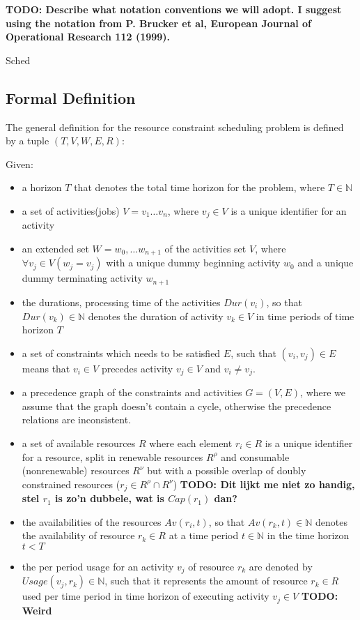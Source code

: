 \documentclass{article}
\newcommand{\TODO}[1]{{\color{red}\textbf{TODO: #1}}}
\newcommand{\renres}[0]{R^\rho} %
\newcommand{\conres}[0]{R^\nu} %
\newcommand{\av}[1]{\textit{Av}(#1)} %
\newcommand{\dur}[1]{\textit{Dur}(#1)} %
\newcommand{\usage}[1]{\textit{Usage}(#1)} %
\begin{document}
\TODO{Describe what notation conventions we will adopt.
I suggest using the notation from P. Brucker et al, European Journal of Operational Research 112 (1999). }

Sched
\subsection{Formal Definition}
The general definition for the resource constraint scheduling problem is defined by a tuple $(T, V, W, E, R)$: \cite{brucker99}

Given:
\begin{itemize}
\item a horizon $T$ that denotes the total time horizon for the problem, where $T \in \mathbb{N}$
\item a set of activities(jobs) $V = v_1 \ldots v_n$, where $v_j \in V$ is a unique identifier for an activity
\item an extended set $W = w_0, \ldots w_{n+1}$ of the activities set $V$, where $\forall v_j \in V (w_j = v_j)$ with a unique dummy beginning activity $w_0$ and a unique dummy terminating activity $w_{n+1}$
\item the durations, processing time of the activities $\dur{v_i}$, so that $\dur{v_k} \in \mathbb{N}$ denotes the duration of activity $v_k \in V$ in time periods of time horizon $T$
\item a set of constraints which needs to be satisfied $E$, such that $(v_i,v_j) \in E$ means that $v_i \in V$ precedes activity $v_j \in V$ and $v_i \neq v_j$.
\item a precedence graph of the constraints and activities $G = (V, E)$, where we assume that the graph doesn't contain a cycle, otherwise the precedence relations are inconsistent.
\item a set of available resources $R$ where each element $r_i \in R$ is a unique identifier for a resource, split in renewable resources $\renres$ and  consumable (nonrenewable) resources $\conres$ but with a possible overlap of doubly constrained resources ($r_j \in \renres \cap \conres$) \TODO{Dit lijkt me niet zo handig, stel $r_1$ is zo'n dubbele, wat is $Cap(r_1)$ dan?}
\item the availabilities of the resources $\av{r_i, t}$, so that $\av{r_k, t} \in \mathbb{N}$ denotes the availability of resource $r_k \in R$ at a time period $t \in \mathbb{N}$ in the time horizon $t < T$
\item the per period usage for an activity $v_j$ of resource $r_k$ are denoted by $\usage{v_j, r_k} \in \mathbb{N}$, such that it represents the amount of resource $r_k \in R$ used per time period in time horizon of executing activity $v_j \in V$ \TODO{Weird}
\end{itemize}
\end{document}
